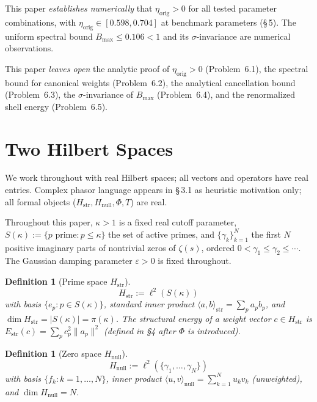 \documentclass[11pt]{article}
\newtheorem{definition}[theorem]{Definition}
\newcommand{\Hstr}{H_{\mathrm{str}}}
\newcommand{\Hnull}{H_{\mathrm{null}}}
\newcommand{\Estr}{E_{\mathrm{str}}}
\newcommand{\etaorig}{\eta_{\mathrm{orig}}}
\begin{document}
This paper \emph{establishes numerically} that $\etaorig>0$ for all
tested parameter combinations, with
$\etaorig\in[0.598,0.704]$ at benchmark parameters (\S\,5).
The uniform spectral bound $B_{\max}\le 0.106<1$ and its
$\sigma$-invariance are numerical observations.

This paper \emph{leaves open} the analytic proof of $\etaorig>0$
(Problem~6.1), the spectral bound for canonical weights
(Problem~6.2), the analytical cancellation bound (Problem~6.3),
the $\sigma$-invariance of $B_{\max}$ (Problem~6.4), and the
renormalized shell energy (Problem~6.5).

\section{Two Hilbert Spaces}

We work throughout with real Hilbert spaces; all vectors and operators have
real entries. Complex phasor language appears in \S\,3.1 as
heuristic motivation only; all formal objects ($\Hstr, \Hnull, \Phi, T$)
are real.

Throughout this paper, $\kappa>1$ is a fixed real cutoff parameter,
$S(\kappa):=\{p\text{ prime}:p\leq\kappa\}$ the set of active primes,
and $\{\gamma_k\}_{k=1}^N$ the first $N$ positive imaginary parts of
nontrivial zeros of $\zeta(s)$, ordered $0<\gamma_1\leq\gamma_2\leq\cdots$.
The Gaussian damping parameter $\varepsilon>0$ is fixed throughout.

\begin{definition}[Prime space $\Hstr$]
\[
\Hstr := \ell^2(S(\kappa))
\]
with basis $\{e_p : p\in S(\kappa)\}$, standard inner product
$\langle a,b\rangle_{\mathrm{str}}=\sum_p a_p b_p$, and
$\dim\Hstr=|S(\kappa)|=\pi(\kappa)$.
The \emph{structural energy} of a weight vector $c\in\Hstr$ is
$\Estr(c)=\sum_p c_p^2\|a_p\|^2$ (defined in \S4 after $\Phi$ is introduced).
\end{definition}

\begin{definition}[Zero space $\Hnull$]
\[
\Hnull := \ell^2(\{\gamma_1,\ldots,\gamma_N\})
\]
with basis $\{f_k:k=1,\ldots,N\}$, inner product
$\langle u,v\rangle_{\mathrm{null}}=\sum_{k=1}^N u_k v_k$
(unweighted), and $\dim\Hnull=N$.
\end{definition}
\end{document}
